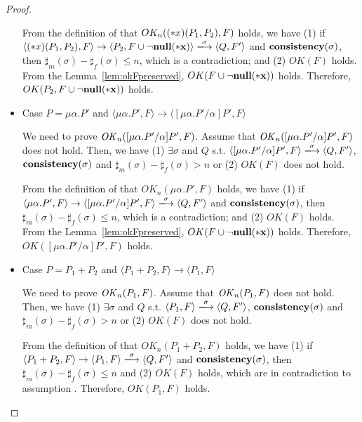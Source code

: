 \begin{proof}
\begin{itemize}
  From the definition of that \(OK_n((*x)(P_1, P_2), F)\) holds, we
  have (1) if \( \langle \Sirx(P_1, P_2), F \rangle \rightarrow
  \langle P_2, F\cup{\snnull} \rangle \xlongrightarrow{\sigma} \langle
  Q, F' \rangle \) and \(\mathbf{consistency}(\sigma)\), then \(\sharp_m(\sigma) -
  \sharp_f(\sigma) \le n \), which is a contradiction; and (2)
  \(OK(F)\) holds. From the Lemma~\ref{lem:okFpreserved},
  \(OK(F\cup{\neg\bf{null}(*x)})\) holds. Therefore, \(OK(P_2, F\cup{\neg\bf{null}(*x)})\)
  holds.

\item Case \( P = \mu\alpha.P' \) and \(  \langle \mu\alpha.P', F \rangle
  \rightarrow \langle [\mu\alpha.P'/\alpha]P', F  \rangle  \)

  We need to prove \(\mathit{OK}_n([\mu\alpha.P'/\alpha]P', F) \).  Assume
  that \(\mathit{OK}_n( [\mu\alpha.P'/\alpha]P', F) \) does not hold. Then, we
  have (1) \( \exists \sigma \) and \(Q\) s.t. \( \langle
  [\mu\alpha.P'/\alpha]P', F \rangle \xlongrightarrow{\sigma} \langle
  Q, F' \rangle \), \(\mathbf{consistency}(\sigma)\) and \(\sharp_{m}(\sigma) -
  \sharp_{f}(\sigma) > n\) or (2) \( OK(F)\) does not hold.

  From the definition of that \(OK_n(\mu\alpha.P', F)\) holds, we have
  (1) if \( \langle \mu\alpha.P', F \rangle \rightarrow \langle
  [\mu\alpha.P'/\alpha]P', F \rangle \xlongrightarrow{\sigma} \langle
  Q, F' \rangle \) and \(\mathbf{consistency}(\sigma)\), then \(\sharp_m(\sigma) -
  \sharp_f(\sigma) \le n \), which is a contradiction; and (2)
  \(OK(F)\) holds. From the Lemma~\ref{lem:okFpreserved},
  \(OK(F\cup{\neg\bf{null}(*x)})\) holds. Therefore,
  \(OK([\mu\alpha.P'/\alpha]P', F) \) holds.


\item Case \( P = P_1 + P_2 \) and \(  \langle P_1 + P_2, F \rangle
  \rightarrow \langle P_1, F  \rangle  \)

  We need to prove \(\mathit{OK}_n(P_1, F) \).  Assume that \(\mathit{OK}_n(P_1, F) \)
  does not hold. Then, we have (1) \( \exists \sigma \) and \(Q\)
  s.t. \( \langle P_1, F \rangle \xlongrightarrow{\sigma} \langle Q,
  F' \rangle \), \(\mathbf{consistency}(\sigma)\) and \(\sharp_{m}(\sigma) -
  \sharp_{f}(\sigma) > n\) or (2) \( OK(F)\) does not hold.

  From the definition of that \(OK_n(P_1 + P_2, F)\) holds, we have
  (1) if \( \langle P_1 + P_2, F \rangle \rightarrow \langle P_1, F
  \rangle \xlongrightarrow{\sigma} \langle Q, F' \rangle \) and
  \(\mathbf{consistency}(\sigma)\), then \(\sharp_m(\sigma) - \sharp_f(\sigma) \le n \) and
  (2) \(OK(F)\) holds, which are in contradiction to assumption
  . Therefore, \(OK(P_1, F) \) holds.


\end{itemize}
\end{proof}
